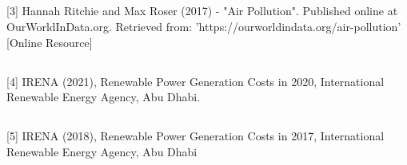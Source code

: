 \documentclass[10pt,twocolumn,letterpaper]{article}
\begin{document}
\subsection*{}
[3] Hannah Ritchie and Max Roser (2017) - "Air Pollution". Published online at OurWorldInData.org. Retrieved from: 'https://ourworldindata.org/air-pollution' [Online Resource]
\subsection*{}
[4] IRENA (2021), Renewable Power Generation Costs in 2020, International Renewable Energy Agency, Abu Dhabi.
\subsection*{}
[5] IRENA (2018), Renewable Power Generation Costs in 2017, International Renewable Energy Agency, Abu Dhabi
\end{document}
